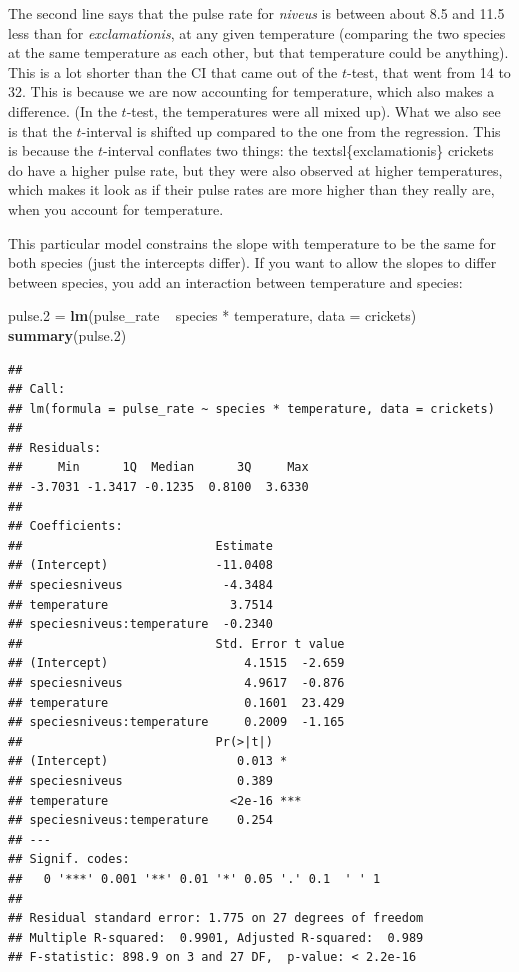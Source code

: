 \documentclass[]{tufte-book}
\newenvironment{Shaded}{}{}
\newcommand{\DataTypeTok}[1]{\textcolor[rgb]{0.56,0.13,0.00}{#1}}
\newcommand{\FloatTok}[1]{\textcolor[rgb]{0.25,0.63,0.44}{#1}}
\newcommand{\KeywordTok}[1]{\textcolor[rgb]{0.00,0.44,0.13}{\textbf{#1}}}
\newcommand{\NormalTok}[1]{#1}
\newcommand{\OperatorTok}[1]{\textcolor[rgb]{0.40,0.40,0.40}{#1}}
\newcommand{\StringTok}[1]{\textcolor[rgb]{0.25,0.44,0.63}{#1}}
\theoremstyle{definition}
\theoremstyle{definition}
\theoremstyle{definition}
\theoremstyle{remark}
\begin{document}
The second line says that the pulse rate for \emph{niveus} is between
about 8.5 and 11.5 less than for \emph{exclamationis}, at any given
temperature (comparing the two species at the same temperature as each
other, but that temperature could be anything). This is a lot shorter
than the CI that came out of the \(t\)-test, that went from 14 to 32.
This is because we are now accounting for temperature, which also makes
a difference. (In the \(t\)-test, the temperatures were all mixed up).
What we also see is that the \(t\)-interval is shifted up compared to
the one from the regression. This is because the \(t\)-interval
conflates  two things: the
textsl\{exclamationis\} crickets do have a higher pulse rate, but they
were also observed at higher temperatures, which makes it look as if
their pulse rates are more higher
 than they really
are, when you account for temperature.

This particular model constrains the slope with temperature to be the
same for both species (just the intercepts differ). If you want to allow
the slopes to differ between species, you add an interaction between
temperature and species:

\begin{Shaded}
\begin{Highlighting}[]
\NormalTok{pulse}\FloatTok{.2}\NormalTok{ =}\StringTok{ }\KeywordTok{lm}\NormalTok{(pulse_rate }\OperatorTok{~}\StringTok{ }\NormalTok{species }\OperatorTok{*}\StringTok{ }\NormalTok{temperature, }
    \DataTypeTok{data =}\NormalTok{ crickets)}
\KeywordTok{summary}\NormalTok{(pulse}\FloatTok{.2}\NormalTok{)}
\end{Highlighting}
\end{Shaded}

\begin{verbatim}
## 
## Call:
## lm(formula = pulse_rate ~ species * temperature, data = crickets)
## 
## Residuals:
##     Min      1Q  Median      3Q     Max 
## -3.7031 -1.3417 -0.1235  0.8100  3.6330 
## 
## Coefficients:
##                           Estimate
## (Intercept)               -11.0408
## speciesniveus              -4.3484
## temperature                 3.7514
## speciesniveus:temperature  -0.2340
##                           Std. Error t value
## (Intercept)                   4.1515  -2.659
## speciesniveus                 4.9617  -0.876
## temperature                   0.1601  23.429
## speciesniveus:temperature     0.2009  -1.165
##                           Pr(>|t|)    
## (Intercept)                  0.013 *  
## speciesniveus                0.389    
## temperature                 <2e-16 ***
## speciesniveus:temperature    0.254    
## ---
## Signif. codes:  
##   0 '***' 0.001 '**' 0.01 '*' 0.05 '.' 0.1  ' ' 1
## 
## Residual standard error: 1.775 on 27 degrees of freedom
## Multiple R-squared:  0.9901, Adjusted R-squared:  0.989 
## F-statistic: 898.9 on 3 and 27 DF,  p-value: < 2.2e-16
\end{verbatim}
\end{document}
